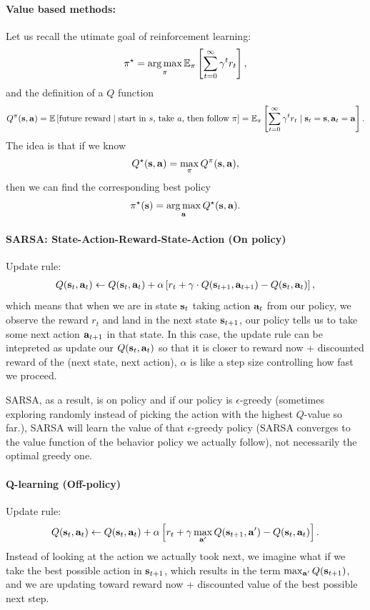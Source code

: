 \documentclass[11pt]{article}  %
\begin{document}
\paragraph{Value based methods:}
Let us recall the utimate goal of reinforcement learning: 
\begin{align*}
  \pi^\star = \operatorname*{arg\,max}_{\pi} \mathbb{E}_{\pi}\left[\sum_{t=0}^{\infty}\gamma^t r_t\right],
\end{align*}
and the definition of a $Q$ function 
\begin{align*}
  Q^{\pi}(\mathbf{s}, \mathbf{a}) = \mathbb{E}\left[\text{future reward} \mid \text{start in }s \text{, take } a \text{, then follow }\pi\right] = \mathbb{E}_{\pi}\left[\sum_{t=0}^{\infty}\gamma^tr_t \mid \mathbf{s}_t = \mathbf{s}, \mathbf{a}_t = \mathbf{a}\right].
\end{align*}
The idea is that if we know 
\begin{align*}
  Q^\star(\mathbf{s}, \mathbf{a}) = \max_{\pi}Q^{\pi}(\mathbf{s}, \mathbf{a}), 
\end{align*}
then we can find the corresponding best policy 
\begin{align*}
  \pi^\star(\mathbf{s}) = \operatorname*{arg\,max}_{\mathbf{a}} Q^\star(\mathbf{s}, \mathbf{a}).
\end{align*}

\paragraph{SARSA: State-Action-Reward-State-Action (On policy)}
Update rule:
\begin{align*}
  Q(\mathbf{s}_t, \mathbf{a}_t) \leftarrow Q(\mathbf{s}_t, \mathbf{a}_t) + \alpha \left[ r_t + \gamma \cdot Q(\mathbf{s}_{t+1}, \mathbf{a}_{t+1}) - Q(\mathbf{s}_t, \mathbf{a}_t) \right],
\end{align*}
which means that when we are in state $\mathbf{s}_t$ taking action $\mathbf{a}_t$ from our policy, we observe the reward $r_t$ and land in the next state $\mathbf{s}_{t+1}$, our policy tells us to take some next action $\mathbf{a}_{t+1}$ in that state.
In this case, the update rule can be intepreted as update our $Q(\mathbf{s}_t, \mathbf{a}_t)$ so that it is closer to reward now + discounted reward of the (next state, next action), $\alpha$ is like a step size controlling how fast we proceed.

SARSA, as a result, is on policy and if our policy is $\epsilon$-greedy (sometimes exploring randomly instead of picking the action with the highest $Q$-value so far.), SARSA will learn the value of that $\epsilon$-greedy policy (SARSA converges to the value function of the behavior policy we actually follow), not necessarily the optimal greedy one.

\paragraph{Q-learning (Off-policy)}
Update rule:
\begin{align*}
  Q(\mathbf{s}_t, \mathbf{a}_t) \leftarrow Q(\mathbf{s}_t, \mathbf{a}_t) + \alpha\left[ r_t + \gamma\max_{\mathbf{a}^\prime} Q(\mathbf{s}_{t+1}, \mathbf{a}^\prime) - Q(\mathbf{s}_t, \mathbf{a}_t) \right].
\end{align*}
Instead of looking at the action we actually took next, we imagine what if we take the best possible action in $\mathbf{s}_{t+1}$, which results in the term $\max_{\mathbf{a}^\prime} Q(\mathbf{s}_{t+1})$, and we are updating toward reward now + discounted value of the best possible next step. 
\end{document}
